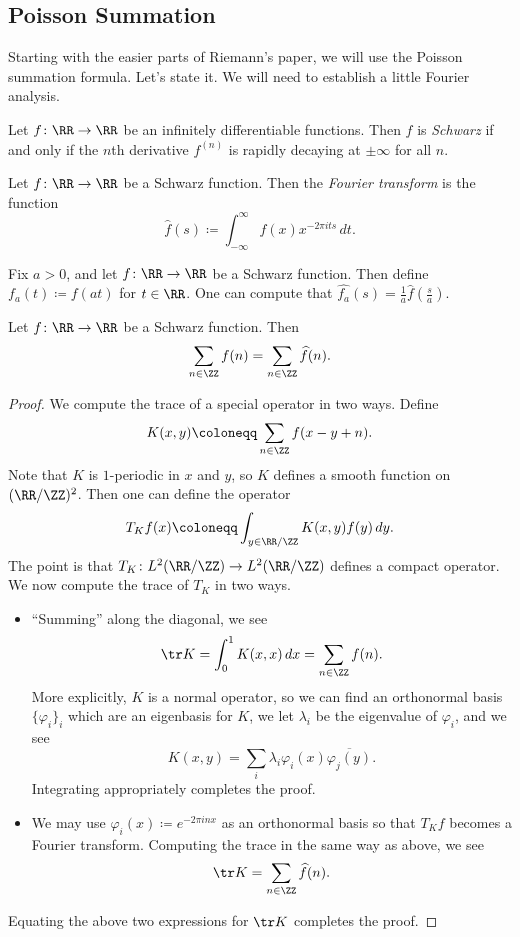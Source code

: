 \documentclass[../notes.tex]{subfiles}
\begin{document}
\subsection{Poisson Summation}
Starting with the easier parts of Riemann's paper, we will use the Poisson summation formula. Let's state it. We will need to establish a little Fourier analysis.
\begin{definition}[Schwarz]
	Let $f\colon\RR\to\RR$ be an infinitely differentiable functions. Then $f$ is \textit{Schwarz} if and only if the $n$th derivative $f^{(n)}$ is rapidly decaying at $\pm\infty$ for all $n$.
\end{definition}
\begin{definition}
	Let $f\colon\RR\to\RR$ be a Schwarz function. Then the \textit{Fourier transform} is the function
	\[\widehat f(s)\coloneqq\int_{-\infty}^\infty f(x)x^{-2\pi its}\,dt.\]
\end{definition}
\begin{example}
	Fix $a>0$, and let $f\colon\RR\to\RR$ be a Schwarz function. Then define $f_a(t)\coloneqq f(at)$ for $t\in\RR$. One can compute that $\widehat{f_a}(s)=\frac1a\widehat f\left(\frac sa\right)$.
\end{example}
\begin{theorem} \label{thm:ps}
	Let $f\colon\RR\to\RR$ be a Schwarz function. Then
	\[\sum_{n\in\ZZ}f(n)=\sum_{n\in\ZZ}\widehat f(n).\]
\end{theorem}
\begin{proof}
	We compute the trace of a special operator in two ways. Define
	\[K(x,y)\coloneqq\sum_{n\in\ZZ}f(x-y+n).\]
	Note that $K$ is $1$-periodic in $x$ and $y$, so $K$ defines a smooth function on $(\RR/\ZZ)^2$. Then one can define the operator
	\[T_Kf(x)\coloneqq\int_{y\in\RR/\ZZ}K(x,y)f(y)\,dy.\]
	The point is that $T_K\colon L^2(\RR/\ZZ)\to L^2(\RR/\ZZ)$ defines a compact operator. We now compute the trace of $T_K$ in two ways.
	\begin{itemize}
		\item ``Summing'' along the diagonal, we see
		\[\tr K=\int_0^1K(x,x)\,dx=\sum_{n\in\ZZ}f(n).\]
		More explicitly, $K$ is a normal operator, so we can find an orthonormal basis $\{\varphi_i\}_i$ which are an eigenbasis for $K$, we let $\lambda_i$ be the eigenvalue of $\varphi_i$, and we see
		\[K(x,y)=\sum_i\lambda_i\varphi_i(x)\overline{\varphi_j(y)}.\]
		Integrating appropriately completes the proof.
		\item We may use $\varphi_i(x)\coloneqq e^{-2\pi inx}$ as an orthonormal basis so that $T_Kf$ becomes a Fourier transform. Computing the trace in the same way as above, we see
		\[\tr K=\sum_{n\in\ZZ}\widehat f(n).\]
	\end{itemize}
	Equating the above two expressions for $\tr K$ completes the proof.
\end{proof}
\end{document}
